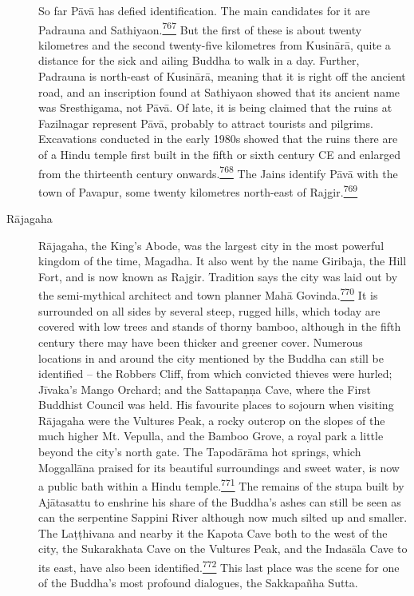 \begin{description}
So far Pāvā has defied identification. The main candidates for it are
Padrauna and
Sathiyaon.\label{footprints_split_019.html_fnref767}\hyperref[footprints_split_025.htmlux5cux23fn767]{\textsuperscript{767}}
But the first of these is about twenty kilometres and the second
twenty-five kilometres from Kusinārā, quite a distance for the sick and
ailing Buddha to walk in a day. Further, Padrauna is north-east of
Kusinārā, meaning that it is right off the ancient road, and an
inscription found at Sathiyaon showed that its ancient name was
Sresthigama, not Pāvā. Of late, it is being claimed that the ruins at
Fazilnagar represent Pāvā, probably to attract tourists and pilgrims.
Excavations conducted in the early 1980s showed that the ruins there are
of a Hindu temple first built in the fifth or sixth century CE and
enlarged from the thirteenth century
onwards.\label{footprints_split_019.html_fnref768}\hyperref[footprints_split_025.htmlux5cux23fn768]{\textsuperscript{768}}
The Jains identify Pāvā with the town of Pavapur, some twenty kilometres
north-east of
Rajgir.\label{footprints_split_019.html_fnref769}\hyperref[footprints_split_025.htmlux5cux23fn769]{\textsuperscript{769}}
\item[Rājagaha]
Rājagaha, the King's Abode, was the largest city in the most powerful
kingdom of the time, Magadha. It also went by the name Giribaja, the
Hill Fort, and is now known as Rajgir. Tradition says the city was laid
out by the semi-mythical architect and town planner Mahā
Govinda.\label{footprints_split_019.html_fnref770}\hyperref[footprints_split_025.htmlux5cux23fn770]{\textsuperscript{770}}
It is surrounded on all sides by several steep, rugged hills, which
today are covered with low trees and stands of thorny bamboo, although
in the fifth century there may have been thicker and greener cover.
Numerous locations in and around the city mentioned by the Buddha can
still be identified -- the Robbers Cliff, from which convicted thieves
were hurled; Jīvaka's Mango Orchard; and the Sattapaṇṇa Cave, where the
First Buddhist Council was held. His favourite places to sojourn when
visiting Rājagaha were the Vultures Peak, a rocky outcrop on the slopes
of the much higher Mt. Vepulla, and the Bamboo Grove, a royal park a
little beyond the city's north gate. The Tapodārāma hot springs, which
Moggallāna praised for its beautiful surroundings and sweet water, is
now a public bath within a Hindu
temple.\label{footprints_split_019.html_fnref771}\hyperref[footprints_split_025.htmlux5cux23fn771]{\textsuperscript{771}}
The remains of the stupa built by Ajātasattu to enshrine his share of
the Buddha's ashes can still be seen as can the serpentine Sappini River
although now much silted up and smaller. The Laṭṭhivana and nearby it
the Kapota Cave both to the west of the city, the Sukarakhata Cave on
the Vultures Peak, and the Indasāla Cave to its east, have also been
identified.\label{footprints_split_019.html_fnref772}\hyperref[footprints_split_025.htmlux5cux23fn772]{\textsuperscript{772}}
This last place was the scene for one of the Buddha's most profound
dialogues, the Sakkapañha Sutta.


\end{description}
